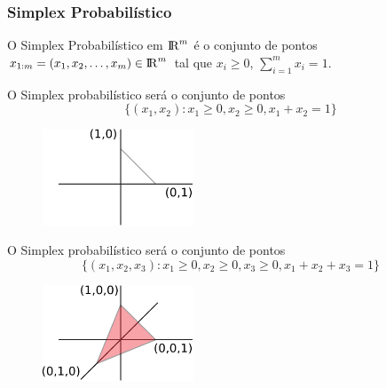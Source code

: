 \begin{frame}[allowframebreaks]
  \frametitle{Simplex Probabilístico}

  \begin{definition}
  O Simplex Probabilístico em ${\rm I\!R}^m$ é o conjunto de pontos
  $x_{1:m} = (x_1, x_2, \ldots, x_m) \in {\rm I\!R}^m$ tal que $x_i \geq 0$, $\sum_{i=1}^{m} x_i = 1$.
  \end{definition}
  \framebreak 
  \begin{example}[$m=2$]
  O Simplex probabilístico será o conjunto de pontos
  \begin{equation}
  \{ (x_1, x_2)  :  x_1 \geq 0 , x_2 \geq 0 , x_1 + x_2 = 1 \}
  \end{equation}
    \begin{figure}[h!]
    \centering
    \includegraphics[width=0.4\textwidth]{images/prob-simplex-2.pdf}
    \label{fig:prob-simplex-2}
    \end{figure}

  \end{example}
  \framebreak
  \begin{example}[$m=3$]
  O Simplex probabilístico será o conjunto de pontos
  \begin{equation}
  \{ (x_1, x_2, x_3)  :  x_1 \geq 0 , x_2 \geq 0 , x_3 \geq 0 , x_1 + x_2 + x_3 = 1 \}
  \end{equation}

    \begin{figure}[h!]
    \centering
    \includegraphics[width=0.4\textwidth]{images/prob-simplex-3.pdf}
    \label{fig:prob-simplex-3}
    \end{figure}

  \end{example}


\end{frame}
